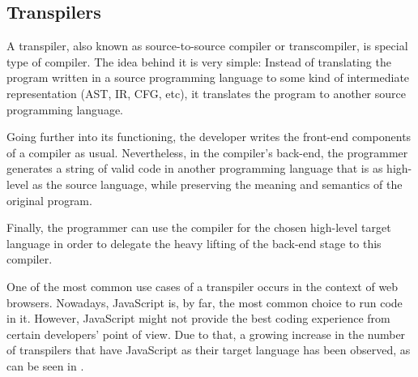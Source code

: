 \subsection{Transpilers}
A transpiler, also known as source-to-source compiler or transcompiler, is special type of compiler. The idea behind it is very simple: Instead of translating the program written in a source programming language to some kind of intermediate representation (AST, IR, CFG, etc), it translates the program to another source programming language.

Going further into its functioning, the developer writes the front-end components of a compiler as usual. Nevertheless, in the compiler's back-end, the programmer generates a string of valid code in another programming language that is as high-level as the source language, while preserving the meaning and semantics of the original program.

Finally, the programmer can use the compiler for the chosen high-level target language in order to delegate the heavy lifting of the back-end stage to this compiler. 

One of the most common use cases of a transpiler occurs in the context of web browsers. Nowadays, JavaScript is, by far, the most common choice to run code in it. However, JavaScript might not provide the best coding experience from certain developers' point of view. Due to that, a growing increase in the number of transpilers that have JavaScript as their target language has been observed, as can be seen in \cite{coffeescriptCompileToJS}.
